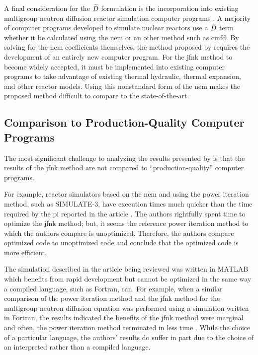     A final consideration for the $\widetilde{D}$ formulation is the incorporation
    into existing multigroup neutron diffusion reactor simulation computer
    programs \cite{casmo4,simulate3,mpact}. A majority of computer programs
    developed to simulate nuclear reactors use a $\widetilde{D}$ term whether it be
    calculated using the \gls{nem} or an other method such as \gls{cmfd}. By
    solving for the \gls{nem} coefficients themselves, the method proposed by
    \citeauthor{qe2paper} requires the development of an entirely new computer
    program. For the \gls{jfnk} method to become widely accepted, it must be
    implemented into existing computer programs to take advantage of existing
    thermal hydraulic, thermal expansion, and other reactor models. Using this
    nonstandard form of the \gls{nem} makes the proposed method difficult to
    compare to the state-of-the-art.

  \subsection{Comparison to Production-Quality Computer Programs}
    The most significant challenge to analyzing the results presented by
    \citeauthor{qe2paper} is that the results of the \gls{jfnk} method are not
    compared to ``production-quality'' computer programs. 
    
    For example, reactor simulators based on the \gls{nem} and using the power
    iteration method, such as SIMULATE-3, have execution times much quicker than
    the time required by the \gls{pi} reported in the article
    \cite{simulate3,qe2paper}. The authors rightfully spent time to optimize the
    \gls{jfnk} method; but, it seems the reference power iteration method to
    which the authors compare is unoptimized. Therefore, the authors compare
    optimized code to unoptimized code and conclude that the optimized code is
    more efficient.
    
    The simulation described in the article being reviewed was written in MATLAB
    which benefits from rapid development but cannot be optimized in the same
    way a compiled language, such as Fortran, can. For example, when a similar
    comparison of the power iteration method and the \gls{jfnk} method for the
    multigroup neutron diffusion equation was performed using a simulation
    written in Fortran, the results indicated the benefits of the \gls{jfnk}
    method were marginal and often, the power iteration method terminated in
    less time \cite{gill_azmy}. While the choice of a particular language, the
    authors' results do suffer in part due to the choice of an interpreted
    rather than a compiled language.

